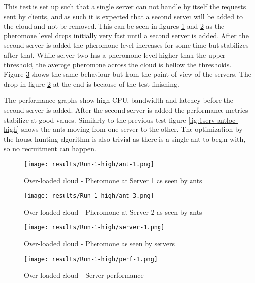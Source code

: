 This test is set up such that a single server can not handle by itself the requests sent by clients, and as such it is expected that a second server will be added to the cloud and not be removed. This can be seen in figures \ref{fig:1serv-ant1-high} and \ref{fig:1serv-ant3-high} as the pheromone level drops initially very fast until a second server is added. After the second server is added the pheromone level increases for some time but stabilizes after that. While server two has a pheromone level higher than the upper threshold, the average pheromone across the cloud is bellow the thresholds. Figure \ref{fig:1serv-pher-high} shows the same behaviour but from the point of view of the servers. The drop in figure \ref{fig:1serv-ant3-high} at the end is because of the test finishing.

The performance graphs show high CPU, bandwidth and latency before the second server is added. After the second server is added the performance metrics stabilize at good values. Similarly to the previous test figure \ref{fig:1serv-antloc-high} shows the ants moving from one server to the other. The optimization by the house hunting algorithm is also trivial as there is a single ant to begin with, so no recruitment can happen.

\begin{figure}[!ht]
	\centering
		\texttt{[image: results/Run-1-high/ant-1.png]}
	\caption{Over-loaded cloud - Pheromone at Server 1 as seen by ants}
	\label{fig:1serv-ant1-high}
\end{figure}

\begin{figure}
	\centering
		\texttt{[image: results/Run-1-high/ant-3.png]}
	\caption{Over-loaded cloud - Pheromone at Server 2 as seen by ants}
	\label{fig:1serv-ant3-high}
\end{figure}

\begin{figure}
	\centering
		\texttt{[image: results/Run-1-high/server-1.png]}
	\caption{Over-loaded cloud - Pheromone as seen by servers}
	\label{fig:1serv-pher-high}
\end{figure}

\begin{figure}
	\centering
		\texttt{[image: results/Run-1-high/perf-1.png]}
	\caption{Over-loaded cloud - Server performance}
	\label{fig:1serv-perf-high}
\end{figure}

